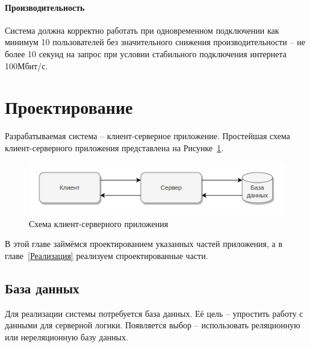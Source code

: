 \documentclass[a4paper,article]{article}
\begin{document}
    \paragraph{Производительность}\label{ТЗ. Производительность}

    Система должна корректно работать при одновременном подключении как минимум 10 пользователей без значительного снижения производительности -- не более 10 секунд на запрос при условии стабильного подключения интернета 100Мбит/с.

    \pagestyle{plain}

    \newpage

    \section{Проектирование}\label{Проектирование}

    Разрабатываемая система -- клиент-серверное приложение. Простейшая схема клиент-серверного приложения представлена на Рисунке~\ref{fig:Схема клиент-серверного приложения}.

    \begin{figure}[h]

        \centering

        \includegraphics[width=0.8\linewidth]{Схема клиент-серверного приложения.png}

        \caption{\centering Схема клиент-серверного приложения}

        \label{fig:Схема клиент-серверного приложения}

    \end{figure}

    В этой главе займёмся проектированием указанных частей приложения, а в главе~\ref{Реализация} реализуем спроектированные части.

    \subsection{База данных}

    Для реализации системы потребуется база данных. Её цель -- упростить работу с данными для серверной логики. Появляется выбор -- использовать реляционную или нереляционную базу данных.
\end{document}
